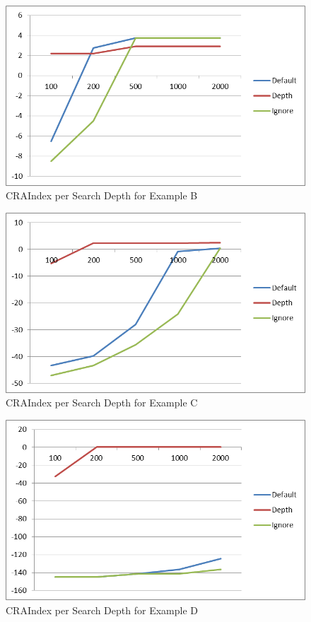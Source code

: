 \documentclass[submission,copyright,creativecommons]{eptcs}
\begin{document}
\begin{figure}[H] \centering
	\includegraphics[width=0.8\linewidth]{Diagramme-Dateien/image001.png}
 \caption{CRAIndex per Search Depth for Example B}
 \label{fig:CRAByDepthB}
\end{figure}

\begin{figure}[H] \centering
	\includegraphics[width=0.8\linewidth]{Diagramme-Dateien/image002.png}
 \caption{CRAIndex per Search Depth for Example C}
 \label{fig:CRAByDepthC}
\end{figure}

\begin{figure}[H] \centering
	\includegraphics[width=0.8\linewidth]{Diagramme-Dateien/image005.png}
 \caption{CRAIndex per Search Depth for Example D}
 \label{fig:CRAByDepthD}
\end{figure}
\end{document}
